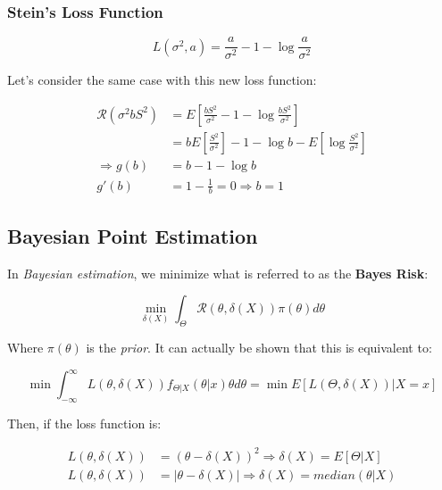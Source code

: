 \documentclass{article}
\begin{document}
\subsubsection{Stein's Loss Function}

\begin{equation*}
    L(\sigma^2,a) = \frac{a}{\sigma^2} - 1 - \log \frac{a}{\sigma^2}
\end{equation*}

Let's consider the same case with this new loss function:

\begin{equation*}
    \begin{split}
        \mathcal{R}(\sigma^2 bS^2) &= E \left[\frac{bS^2}{\sigma^2} - 1 - \log \frac{bS^2}{\sigma^2} \right]\\
                        &= bE \left[ \frac{S^2}{\sigma^2}\right] - 1 - \log b - E\left[\log \frac{S^2}{\sigma^2} \right]\\
                    \Rightarrow    g(b) &= b-1-\log b\\
                        g'(b) &= 1-\frac{1}{b} = 0 \Rightarrow b = 1
    \end{split}
\end{equation*}


\subsection{Bayesian Point Estimation}

In \textit{Bayesian estimation}, we minimize what is referred to as the \textbf{Bayes Risk}:

\begin{equation*}
    \min_{\delta(X)} \int_\Theta \mathcal{R}(\theta,\delta(X)) \pi(\theta) d\theta
\end{equation*}

Where $\pi(\theta)$ is the \textit{prior}. It can actually be shown that this is equivalent to:

\begin{equation*}
    \min \int_{-\infty}^\infty L(\theta,\delta(X)) f_{\Theta|X}(\theta|x) \theta d\theta= \min E\left[L(\Theta,\delta(X)) | X = x \right]
\end{equation*}

\noindent Then, if the loss function is:

\begin{equation*}
\begin{split}
    L(\theta,\delta(X)) &= (\theta - \delta(X))^2 \Rightarrow \delta(X) = E[\Theta|X]\\
    L(\theta,\delta(X)) &= |\theta - \delta(X)| \Rightarrow \delta(X) = median(\theta|X)
\end{split}
\end{equation*}
\end{document}
